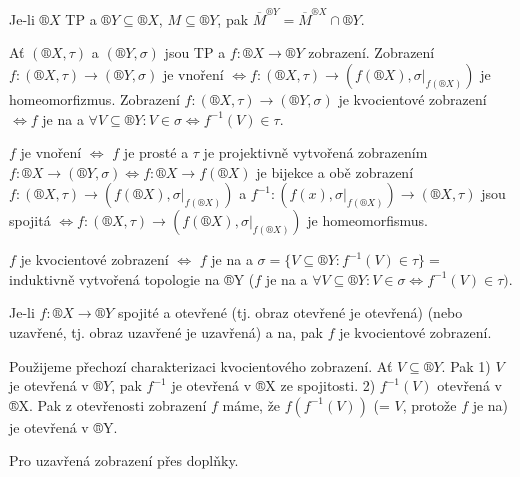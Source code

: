 \documentclass[12pt]{article}					%
\begin{document}

        \begin{priklad}
            Je-li $®X$ TP a $®Y \subseteq ®X$, $M \subseteq ®Y$, pak $\overline{M}^{®Y} = \overline{M}^{®X}\cap ®Y$.
        \end{priklad}

        \begin{tvrzeni}
            Ať $(®X, \tau)$ a $(®Y, \sigma)$ jsou TP a $f:®X \rightarrow ®Y$ zobrazení. Zobrazení $f:(®X, \tau) \rightarrow (®Y, \sigma)$ je vnoření $\Leftrightarrow f:(®X, \tau) \rightarrow (f(®X), \sigma|_{f(®X)})$ je homeomorfizmus. Zobrazení $f:(®X, \tau) \rightarrow (®Y, \sigma)$ je kvocientové zobrazení $\Leftrightarrow f$ je na a $\forall V \subseteq ®Y: V \in \sigma \Leftrightarrow f^{-1}(V) \in \tau$.

            \begin{dukazin}
                $f$ je vnoření $\Leftrightarrow$ $f$ je prosté a $\tau$ je projektivně vytvořená zobrazením $f: ®X \rightarrow (®Y, \sigma) \Leftrightarrow f: ®X \rightarrow f(®X)$ je bijekce a obě zobrazení $f: (®X, \tau) \rightarrow (f(®X), \sigma|_{f(®X)})$ a $f^{-1}: (f(x), \sigma|_{f(®X)}) \rightarrow (®X, \tau)$ jsou spojitá $\Leftrightarrow f:(®X, \tau) \rightarrow (f(®X), \sigma|_{f(®X)})$ je homeomorfismus.

                $f$ je kvocientové zobrazení $\Leftrightarrow$ $f$ je na a $\sigma = \{V \subseteq ®Y: f^{-1}(V) \in \tau\} =$ induktivně vytvořená topologie na ®Y ($f$ je na a $\forall V \subseteq ®Y: V \in \sigma \Leftrightarrow f^{-1}(V)\in \tau)$.
            \end{dukazin}
        \end{tvrzeni}

        \begin{tvrzeni}
            Je-li $f: ®X \rightarrow ®Y$ spojité a otevřené (tj. obraz otevřené je otevřená) (nebo uzavřené, tj. obraz uzavřené je uzavřená) a na, pak $f$ je kvocientové zobrazení.

            \begin{dukazin}
                Použijeme přechozí charakterizaci kvocientového zobrazení. Ať $V \subseteq ®Y$. Pak 1) $V$ je otevřená v $®Y$, pak $f^{-1}$ je otevřená v ®X ze spojitosti. 2) $f^{-1}(V)$ otevřená v ®X. Pak z otevřenosti zobrazení $f$ máme, že $f(f^{-1}(V))$ (= $V$, protože $f$ je na) je otevřená v ®Y.

                Pro uzavřená zobrazení přes doplňky.
            \end{dukazin}
        \end{tvrzeni}
\end{document}
